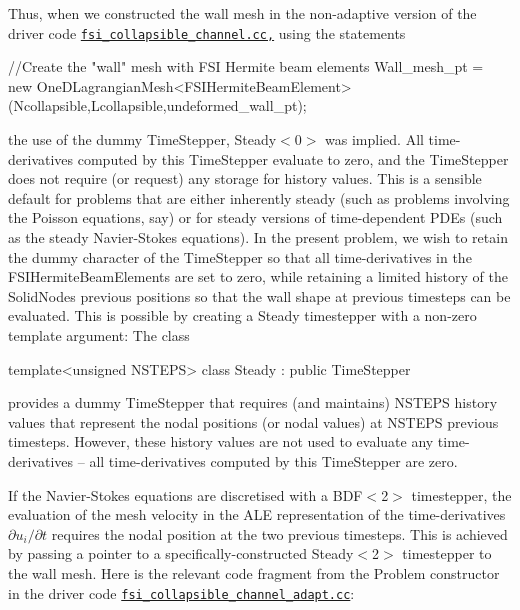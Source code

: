 Thus, when we constructed the wall mesh in the non-\/adaptive version of the driver code \href{../../../../demo_drivers/interaction/fsi_collapsible_channel/fsi_collapsible_channel.cc}{\tt fsi\+\_\+collapsible\+\_\+channel.\+cc,} using the statements


\begin{DoxyCode}
\textcolor{comment}{//Create the "wall" mesh with FSI Hermite beam elements}
Wall\_mesh\_pt = \textcolor{keyword}{new} OneDLagrangianMesh<FSIHermiteBeamElement>
 (Ncollapsible,Lcollapsible,undeformed\_wall\_pt);
\end{DoxyCode}


the use of the dummy {\ttfamily Time\+Stepper}, {\ttfamily Steady$<$0$>$} was implied. All time-\/derivatives computed by this {\ttfamily Time\+Stepper} evaluate to zero, and the {\ttfamily Time\+Stepper} does not require (or request) any storage for history values. This is a sensible default for problems that are either inherently steady (such as problems involving the Poisson equations, say) or for steady versions of time-\/dependent P\+D\+Es (such as the steady Navier-\/\+Stokes equations). In the present problem, we wish to retain the dummy character of the {\ttfamily Time\+Stepper} so that all time-\/derivatives in the {\ttfamily F\+S\+I\+Hermite\+Beam\+Elements} are set to zero, while retaining a limited history of the {\ttfamily Solid\+Node\textquotesingle{}s} previous positions so that the wall shape at previous timesteps can be evaluated. This is possible by creating a {\ttfamily Steady} timestepper with a non-\/zero template argument\+: The class


\begin{DoxyCode}
\textcolor{keyword}{template}<\textcolor{keywordtype}{unsigned} NSTEPS>
\textcolor{keyword}{class }Steady : \textcolor{keyword}{public} TimeStepper
\end{DoxyCode}


provides a dummy {\ttfamily Time\+Stepper} that requires (and maintains) {\ttfamily N\+S\+T\+E\+PS} history values that represent the nodal positions (or nodal values) at {\ttfamily N\+S\+T\+E\+PS} previous timesteps. However, these history values are not used to evaluate any time-\/derivatives -- all time-\/derivatives computed by this {\ttfamily Time\+Stepper} are zero.

If the Navier-\/\+Stokes equations are discretised with a {\ttfamily B\+D\+F$<$2$>$} timestepper, the evaluation of the mesh velocity in the A\+LE representation of the time-\/derivatives $ \partial u_i/\partial t $ requires the nodal position at the two previous timesteps. This is achieved by passing a pointer to a specifically-\/constructed {\ttfamily Steady$<$2$>$} timestepper to the wall mesh. Here is the relevant code fragment from the Problem constructor in the driver code \href{../../../../demo_drivers/interaction/fsi_collapsible_channel/fsi_collapsible_channel_adapt.cc}{\tt fsi\+\_\+collapsible\+\_\+channel\+\_\+adapt.\+cc}\+:


